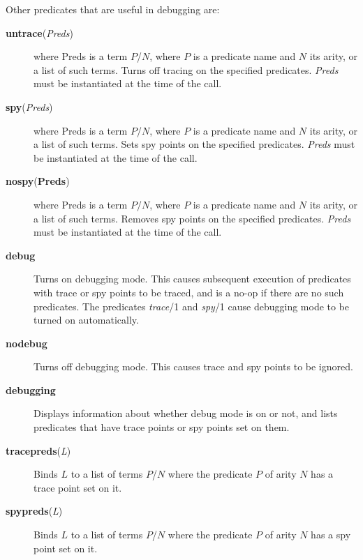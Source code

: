 Other predicates that are useful in debugging are:

\begin{description}
\item[{\bf untrace}({\em Preds})]
    where Preds is a term $P$/$N$, where $P$ is a predicate name and $N$
    its arity, or a list of such terms.
    Turns off tracing on the specified predicates.
    {\em Preds} must be instantiated at the time of the call.

\item[{\bf spy}({\em Preds})] 
    where Preds is a term $P$/$N$, where $P$ is a predicate name and $N$
    its arity, or a list of such terms.
    Sets spy points on the specified predicates.
    {\em Preds} must be instantiated at the time of the call.

\item[{\bf nospy}({\bf Preds})] 
    where Preds is a term $P$/$N$, where $P$ is a predicate name and $N$
    its arity, or a list of such terms.
    Removes spy points on the specified predicates.
    {\em Preds} must be instantiated at the time of the call.

\item[{\bf debug}] 
    Turns on debugging mode.
    This causes subsequent execution of predicates with trace or spy
    points to be traced, and is a no-op if there are no such predicates.
    The predicates {\em trace}/1 and {\em spy}/1 cause debugging mode
    to be turned on automatically.

\item[{\bf nodebug}] 
    Turns off debugging mode.
    This causes trace and spy points to be ignored.

\item[{\bf debugging}] 
    Displays information about whether debug mode is on or not, and lists
    predicates that have trace points or spy points set on them.

\item[{\bf tracepreds}({\em L})]
    Binds $L$ to a list of terms $P$/$N$ where the predicate $P$ of arity $N$
    has a trace point set on it.

\item[{\bf spypreds}({\em L})] 
    Binds $L$ to a list of terms $P$/$N$ where the predicate $P$ of arity $N$
    has a spy point set on it.
\end{description}


